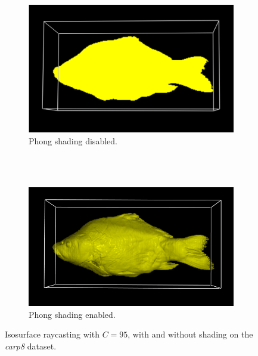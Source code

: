 \documentclass[a4paper]{article}
\begin{document}
\begin{figure}[h]
  \centering
  \begin{subfigure}[b]{\textwidth}
    \includegraphics[width=\textwidth]{carp-iso-95}
    \caption{Phong shading disabled.}
  \end{subfigure}
  \\~\\
  \begin{subfigure}[b]{\textwidth}
    \includegraphics[width=\textwidth]{carp-iso-95-shaded}
    \caption{Phong shading enabled.}
  \end{subfigure}
  \caption{Isosurface raycasting with $C = 95$, with and without shading on the \textit{carp8} dataset.}
  \label{fig:isosurface}
\end{figure}
\end{document}
